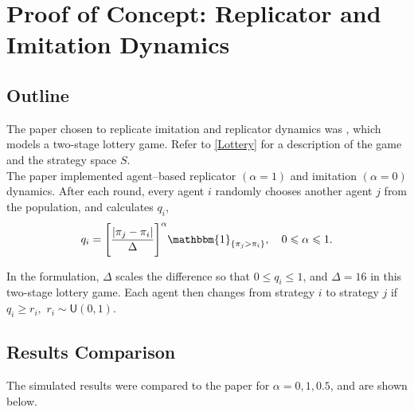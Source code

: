 
\section{Proof of Concept: Replicator and Imitation Dynamics} \label{Lottery_Me}
\subsection{Outline}
The paper chosen to replicate imitation and replicator dynamics was \cite{RN30}, which models a two-stage lottery game. Refer to \ref{Lottery} for a description of the game and the strategy space $S$. \\

The paper implemented agent--based replicator $(\alpha = 1)$ and imitation $(\alpha = 0)$ dynamics. After each round, every agent $i$ randomly chooses another agent $j$ from the population, and calculates $q_i$, \\

\begin{align} \label{rep}
q_i = \Bigg[ \frac{|\pi_j - \pi_i|}{\Delta} \Bigg]^\alpha \mathbbm{1}_{\{\pi_j>\pi_i\}}, \quad  0 \leq \alpha \leq 1.\end{align} 

In the formulation, $\Delta$ scales the difference so that $0 \leq q_i \leq 1$, and $\Delta = 16$ in this two-stage lottery game. Each agent then changes from strategy $i$ to strategy $j$ if $q_i \geq r_i,$ $r_i \sim \mathsf{U}(0,1)$. \\

\subsection{Results Comparison}
The simulated results were compared to the paper for $\alpha = 0, 1, 0.5$, and are shown below. \\

